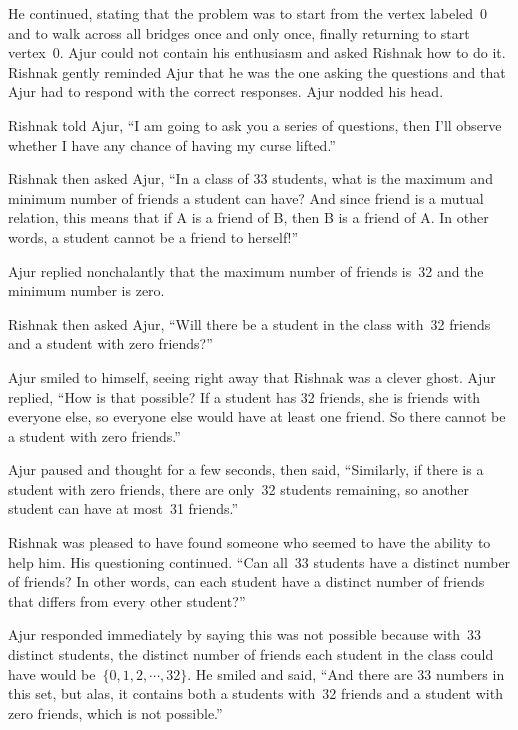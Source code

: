 
He continued, stating that the problem was to start from the vertex labeled~0 and to walk across all bridges once and only once, finally returning to start vertex~0. Ajur could not contain his enthusiasm and asked Rishnak how to do it. Rishnak gently reminded Ajur that he was the one asking the questions and that Ajur had to respond with the correct responses. Ajur nodded his head.

Rishnak told Ajur, ``I am going to ask you a series of questions, then I'll observe whether I have any chance of having my curse lifted.''

Rishnak then asked Ajur, ``In a class of 33 students, what is the maximum and minimum number of friends a student can have? And since friend is a mutual relation, this means that if A is a friend of B, then B is a friend of A.  In other words, a student cannot be a friend to herself!''

Ajur replied nonchalantly that the maximum number of friends is~32 and the minimum number is zero.

Rishnak then asked Ajur, ``Will there be a student in the class with~32 friends and a student with zero friends?''

Ajur smiled to himself, seeing right away that Rishnak was a clever ghost.  Ajur replied, ``How is that possible?  If a student has 32 friends, she is friends with everyone else, so everyone else would have at least one friend.  So there cannot be a student with zero friends.''

Ajur paused and thought for a few seconds, then said, ``Similarly, if there is a student with zero friends, there are only~32 students remaining, so another student can have at most~31 friends.''

Rishnak was pleased to have found someone who seemed to have the ability to help him. His questioning continued.  ``Can all~33 students have a distinct number of friends? In other words, can each student have a distinct number of friends that differs from every other student?''

Ajur responded immediately by saying this was not possible because with~33 distinct students, the distinct number of friends each student in the class could have would be~$\{0,1,2,\cdots,32\}$. He smiled and said, ``And there are 33 numbers in this set, but alas, it contains both a students with~32 friends and a student with zero friends, which is not possible.''

